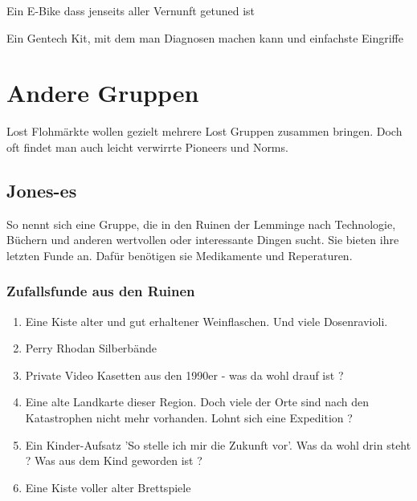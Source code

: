 \begin{npcBox}[title=Flash]
    \begin{stressSection}
    \end{stressSection}
    \begin{tabularx}{\textwidth}{ XX }
    \end{tabularx}

    \begin{consequences}
    \item {}
    \item {}
    \item {}
    \end{consequences}

    \begin{equipment}
    \item Ein E-Bike dass jenseits aller Vernunft getuned ist
    \item Ein Gentech Kit, mit dem man Diagnosen machen kann und einfachste Eingriffe
    \end{equipment}
\end{npcBox}
\newpage

\chapter{Andere Gruppen}

Lost Flohmärkte wollen gezielt mehrere Lost Gruppen zusammen bringen. Doch oft findet man auch leicht verwirrte Pioneers und Norms.

\section{Jones-es}

So nennt sich eine Gruppe, die in den Ruinen der Lemminge nach Technologie, Büchern und anderen wertvollen oder interessante Dingen sucht. Sie bieten ihre letzten Funde an. Dafür benötigen sie Medikamente und Reperaturen.

\subsection{Zufallsfunde aus den Ruinen}

\begin{enumerate}
    \item Eine Kiste alter und gut erhaltener Weinflaschen. Und viele Dosenravioli.
    \item Perry Rhodan Silberbände
    \item Private Video Kasetten aus den 1990er - was da wohl drauf ist ?
    \item Eine alte Landkarte dieser Region. Doch viele der Orte sind nach den Katastrophen nicht mehr vorhanden. Lohnt sich eine Expedition ?
    \item Ein Kinder-Aufsatz 'So stelle ich mir die Zukunft vor'. Was da wohl drin steht ? Was aus dem Kind geworden ist ?
    \item Eine Kiste voller alter Brettspiele
\end{enumerate}

